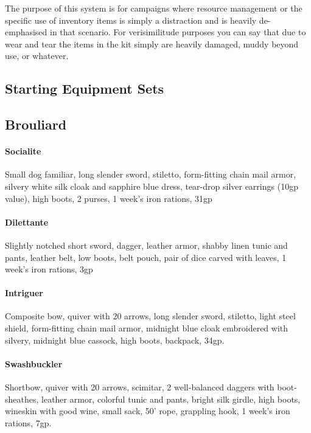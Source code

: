 \begin{framed}\centering
The purpose of this system is for campaigns where resource management or the specific use of inventory items is simply a distraction and is heavily de-emphasised in that scenario. For verisimilitude purposes you can say that due to wear and tear the items in the kit simply are heavily damaged, muddy beyond use, or whatever.  
\end{framed}
\begin{multicols}{2}
\section{Starting Equipment Sets}

\subsection{Brouliard}

\paragraph{Socialite} Small dog familiar, long slender sword, stiletto, form-fitting chain mail armor, silvery white silk cloak and sapphire blue dress, tear-drop silver earrings (10gp value), high boots, 2 purses, 1 week’s iron rations, 31gp

\paragraph{Dilettante} Slightly notched short sword, dagger, leather armor, shabby linen tunic and pants, leather belt, low boots, belt pouch, pair of dice carved with leaves, 1 week’s iron rations, 3gp

\paragraph{Intriguer} Composite bow, quiver with 20 arrows, long slender sword, stiletto, light steel shield, form-fitting chain mail armor, midnight blue cloak embroidered with silvery, midnight blue cassock, high boots, backpack, 34gp.

\paragraph{Swashbuckler} Shortbow, quiver with 20 arrows, scimitar, 2 well-balanced daggers with boot- sheathes, leather armor, colorful tunic and pants, bright silk girdle, high boots, wineskin with good wine, small sack, 50' rope, grappling hook, 1 week’s iron rations, 7gp.


\end{multicols}
